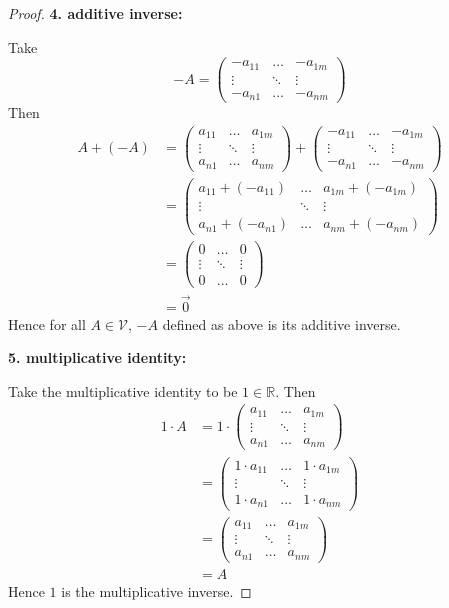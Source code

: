 \documentclass{article}
\begin{document}
\begin{proof}
\textbf{4. additive inverse:}

Take $$-A = \begin{pmatrix} -a_{11} & \ldots & -a_{1m} \\ \vdots &  \ddots & \vdots \\ -a_{n1} &  \ldots & -a_{nm} \end{pmatrix} $$
Then 
\begin{align*}
A + (-A) &= \begin{pmatrix} a_{11} & \ldots & a_{1m} \\ \vdots &  \ddots & \vdots \\ a_{n1} &  \ldots & a_{nm} \end{pmatrix} + \begin{pmatrix} -a_{11} & \ldots & -a_{1m} \\ \vdots &  \ddots & \vdots \\ -a_{n1} &  \ldots & -a_{nm} \end{pmatrix} \\
&= \begin{pmatrix} a_{11}+(-a_{11}) & \ldots & a_{1m}+ (-a_{1m}) \\ \vdots &  \ddots & \vdots \\ a_{n1}+(-a_{n1}) &  \ldots & a_{nm}+(-a_{nm}) \end{pmatrix} \\
&= \begin{pmatrix} 0 & \ldots & 0 \\ \vdots & \ddots & \vdots \\ 0 & \ldots & 0 \end{pmatrix} \\
&= \vec{0}
\end{align*}
Hence for all $A \in \mathcal{V}$, $-A$ defined as above is its additive inverse.
\smallskip

\textbf{5. multiplicative identity:}

Take the multiplicative identity to be $1 \in \mathbb{R}$. Then
\begin{align*}
1 \cdot  A &= 1 \cdot \begin{pmatrix} a_{11} & \ldots & a_{1m} \\ \vdots &  \ddots & \vdots \\ a_{n1} &  \ldots & a_{nm} \end{pmatrix} \\
&= \begin{pmatrix} 1 \cdot a_{11} & \ldots & 1 \cdot a_{1m} \\ \vdots &  \ddots & \vdots \\ 1 \cdot a_{n1} &  \ldots & 1 \cdot a_{nm} \end{pmatrix} \\
&= \begin{pmatrix} a_{11} & \ldots & a_{1m} \\ \vdots &  \ddots & \vdots \\ a_{n1} &  \ldots & a_{nm} \end{pmatrix}\\
&= A
\end{align*}
Hence $1$ is the multiplicative inverse.
\smallskip


\end{proof}
\end{document}
